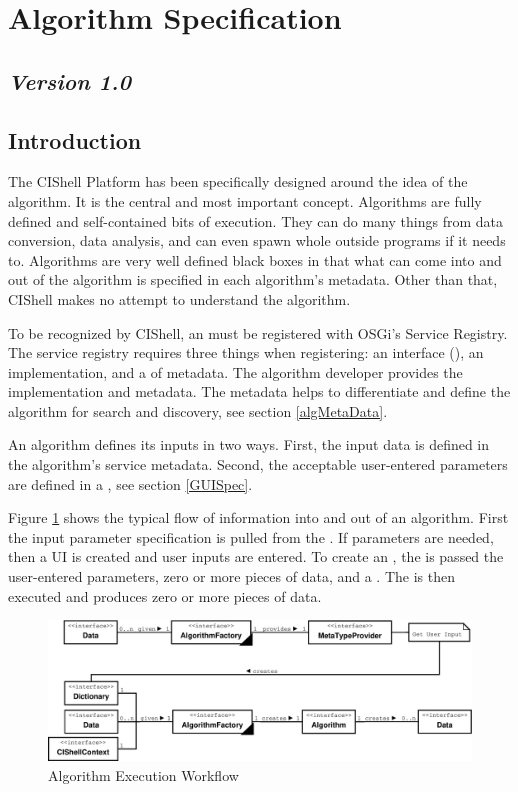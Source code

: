 \section{Algorithm Specification}

\subsection*{\textit{Version 1.0}}

\subsection{Introduction}

The CIShell Platform has been specifically designed around the idea of the
algorithm. It is the central and most important concept. Algorithms are fully
defined and self-contained bits of execution. They can do many things from data
conversion, data analysis, and can even spawn whole outside programs if it needs
to. Algorithms are very well defined black boxes in that what can come into and
out of the algorithm is specified in each algorithm's metadata. Other than that,
CIShell makes no attempt to understand the algorithm.

To be recognized by CIShell, an  must be registered with
OSGi's Service Registry. The service registry requires three things when
registering: an interface (), an implementation, and a
 of metadata. The algorithm developer provides the
implementation and metadata. The metadata helps to differentiate and define the
algorithm for search and discovery, see section \ref{algMetaData}.

An algorithm defines its inputs in two ways. First, the input data is defined in
the algorithm's service metadata. Second, the acceptable user-entered parameters
are defined in a , see section \ref{GUISpec}.

Figure \ref{fig:algExecWorkflow} shows the typical flow of information into and
out of an algorithm. First the input parameter specification is pulled from the
. If parameters are needed, then a UI is created and user
inputs are entered. To create an , the 
is passed the user-entered parameters, zero or more pieces of data, and a
. The  is then executed and produces zero
or more pieces of data.

\begin{figure}[htb!]
\centering
\includegraphics[width=150mm]{../img/algExecWorkflow.pdf}
\caption{Algorithm Execution Workflow}
\label{fig:algExecWorkflow}
\end{figure}

